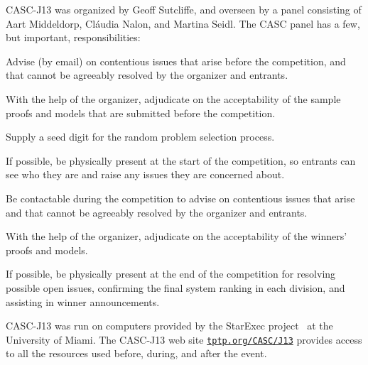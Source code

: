 \documentclass[aic]{iosart2x}
\newcommand{\smalltt}[1]{\small \texttt{#1}}
\newenvironment{packed_itemize}{
\vspace*{-0.3em}
\begin{itemize}
  \setlength{\partopsep}{0pt}
  \setlength{\itemsep}{1pt}
  \setlength{\parskip}{0pt}
  \setlength{\parsep}{0pt}
}{\end{itemize}}
\newcommand{\THIS}{\mbox{CASC-J13}}
\begin{document}
\THIS{} was organized by Geoff Sutcliffe,
and overseen by a panel consisting of
Aart Middeldorp, Cl{\' a}udia Nalon, and Martina Seidl.
The CASC panel has a few, but important, responsibilities:
\begin{packed_itemize}
\item Advise (by email) on contentious issues that arise before the competition, and that cannot
      be agreeably resolved by the organizer and entrants.
\item With the help of the organizer, adjudicate on the acceptability of the sample proofs and
      models that are submitted before the competition.
\item Supply a seed digit for the random problem selection process.
\item If possible, be physically present at the start of the competition, so entrants can see who
      they are and raise any issues they are concerned about.
\item Be contactable during the competition to advise on contentious issues that arise and that
      cannot be agreeably resolved by the organizer and entrants.
\item With the help of the organizer, adjudicate on the acceptability of the winners' proofs and
      models.
\item If possible, be physically present at the end of the competition for resolving possible 
      open issues, confirming the final system ranking in each division, and assisting in winner 
      announcements.
\end{packed_itemize}

\THIS{} was run on computers provided by the StarExec project~\cite{SST14} at the
University of Miami.
The \THIS{} web site \href{http://tptp.org/CASC/J13}{\smalltt{tptp.org/CASC/J13}}
provides access to all the resources used before, during, and after the event.
\end{document}
